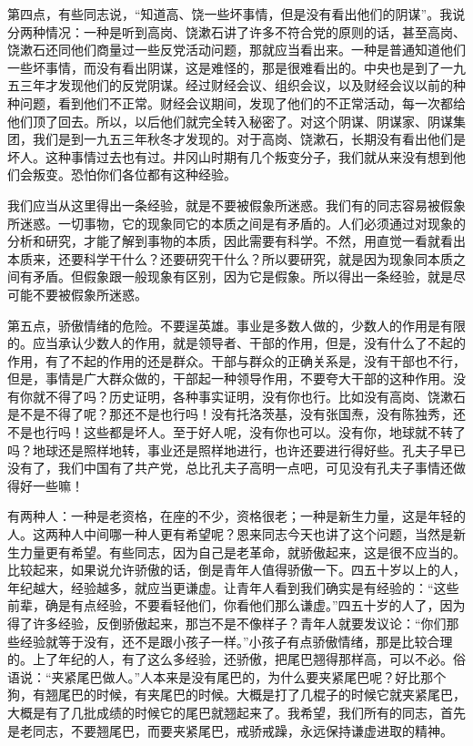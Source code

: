 第四点，有些同志说，“知道高、饶一些坏事情，但是没有看出他们的阴谋”。我说分两种情况：一种是听到高岗、饶漱石讲了许多不符合党的原则的话，甚至高岗、饶漱石还同他们商量过一些反党活动问题，那就应当看出来。一种是普通知道他们一些坏事情，而没有看出阴谋，这是难怪的，那是很难看出的。中央也是到了一九五三年才发现他们的反党阴谋。经过财经会议、组织会议，以及财经会议以前的种种问题，看到他们不正常。财经会议期间，发现了他们的不正常活动，每一次都给他们顶了回去。所以，以后他们就完全转入秘密了。对这个阴谋、阴谋家、阴谋集团，我们是到一九五三年秋冬才发现的。对于高岗、饶漱石，长期没有看出他们是坏人。这种事情过去也有过。井冈山时期有几个叛变分子，我们就从来没有想到他们会叛变。恐怕你们各位都有这种经验。

我们应当从这里得出一条经验，就是不要被假象所迷惑。我们有的同志容易被假象所迷惑。一切事物，它的现象同它的本质之间是有矛盾的。人们必须通过对现象的分析和研究，才能了解到事物的本质，因此需要有科学。不然，用直觉一看就看出本质来，还要科学干什么？还要研究干什么？所以要研究，就是因为现象同本质之间有矛盾。但假象跟一般现象有区别，因为它是假象。所以得出一条经验，就是尽可能不要被假象所迷惑。

第五点，骄傲情绪的危险。不要逞英雄。事业是多数人做的，少数人的作用是有限的。应当承认少数人的作用，就是领导者、干部的作用，但是，没有什么了不起的作用，有了不起的作用的还是群众。干部与群众的正确关系是，没有干部也不行，但是，事情是广大群众做的，干部起一种领导作用，不要夸大干部的这种作用。没有你就不得了吗？历史证明，各种事实证明，没有你也行。比如没有高岗、饶漱石是不是不得了呢？那还不是也行吗！没有托洛茨基，没有张国焘，没有陈独秀，还不是也行吗！这些都是坏人。至于好人呢，没有你也可以。没有你，地球就不转了吗？地球还是照样地转，事业还是照样地进行，也许还要进行得好些。孔夫子早已没有了，我们中国有了共产党，总比孔夫子高明一点吧，可见没有孔夫子事情还做得好一些嘛！

有两种人：一种是老资格，在座的不少，资格很老；一种是新生力量，这是年轻的人。这两种人中间哪一种人更有希望呢？恩来同志今天也讲了这个问题，当然是新生力量更有希望。有些同志，因为自己是老革命，就骄傲起来，这是很不应当的。比较起来，如果说允许骄傲的话，倒是青年人值得骄傲一下。四五十岁以上的人，年纪越大，经验越多，就应当更谦虚。让青年人看到我们确实是有经验的：“这些前辈，确是有点经验，不要看轻他们，你看他们那么谦虚。”四五十岁的人了，因为得了许多经验，反倒骄傲起来，那岂不是不像样子？青年人就要发议论：“你们那些经验就等于没有，还不是跟小孩子一样。”小孩子有点骄傲情绪，那是比较合理的。上了年纪的人，有了这么多经验，还骄傲，把尾巴翘得那样高，可以不必。俗语说：“夹紧尾巴做人。”人本来是没有尾巴的，为什么要夹紧尾巴呢？好比那个狗，有翘尾巴的时候，有夹尾巴的时候。大概是打了几棍子的时候它就夹紧尾巴，大概是有了几批成绩的时候它的尾巴就翘起来了。我希望，我们所有的同志，首先是老同志，不要翘尾巴，而要夹紧尾巴，戒骄戒躁，永远保持谦虚进取的精神。

